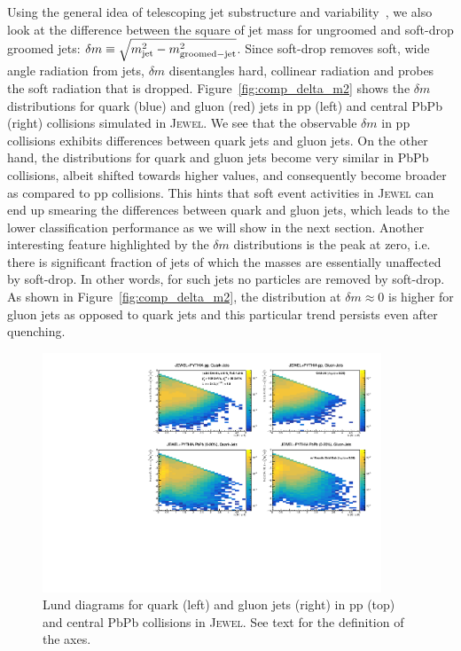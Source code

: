 \documentclass[notoc,preprintnumbers]{JHEP3}
\begin{document}
Using the general idea of telescoping jet substructure and variability~\cite{Chien:2017xrb}, we also look at the difference between the square of jet mass for ungroomed and soft-drop groomed jets: $\delta m \equiv \sqrt{m_{\rm jet}^2-m_{\rm groomed-jet}^2}$. Since soft-drop removes soft, wide angle radiation from jets, $\delta m$ disentangles hard, collinear radiation and probes the soft radiation that is dropped. Figure~\ref{fig:comp_delta_m2} shows the $\delta m$ distributions for quark (blue) and gluon (red) jets in pp (left) and central PbPb (right) collisions simulated in \textsc{Jewel}. We see that the observable $\delta m$ in pp collisions exhibits differences between quark jets and gluon jets. On the other hand, the distributions for quark and gluon jets become very similar in PbPb collisions, albeit shifted towards higher values, and consequently become broader as compared to pp collisions. This hints that soft event activities in \textsc{Jewel} can end up smearing the differences between quark and gluon jets, which leads to the lower classification performance as we will show in the next section. Another interesting feature highlighted by the $\delta m$ distributions is the peak at zero, i.e. there is significant fraction of jets of which the masses are essentially unaffected by soft-drop. In other words, for such jets no particles are removed by soft-drop. As shown in Figure~\ref{fig:comp_delta_m2}, the distribution at $\delta m \approx 0$ is higher for gluon jets as opposed to quark jets and this particular trend persists even after quenching.

\begin{figure}[t]
	\centering
	\includegraphics[width=0.9\textwidth]{Fig10}
	\caption{Lund diagrams for quark (left) and gluon jets (right) in pp (top) and central PbPb collisions in \textsc{Jewel}. See text for the definition of the axes.}
\label{fig:Lund_full}
\end{figure}
\end{document}
